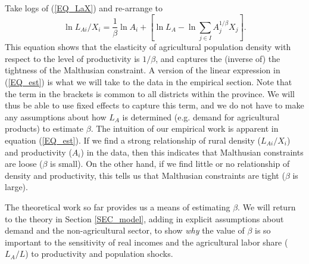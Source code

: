 \documentclass[11pt]{article}
\begin{document}
Take logs of (\ref{EQ_LaX}) and re-arrange to
\begin{equation}
\ln L_{Ai}/X_i = \frac{1}{\beta} \ln A_{i} + \left[\ln L_A - \ln \sum_{j\in I} A_{j}^{1/\beta}X_{j} \right]. \label{EQ_est}
\end{equation}
This equation shows that the elasticity of agricultural population density with respect to the level of productivity is $1/\beta$, and captures the (inverse of) the tightness of the Malthusian constraint. A version of the linear expression in (\ref{EQ_est}) is what we will take to the data in the empirical section. Note that the term in the brackets is common to all districts within the province. We will thus be able to use fixed effects to capture this term, and we do not have to make any assumptions about how $L_A$ is determined (e.g. demand for agricultural products) to estimate $\beta$. The intuition of our empirical work is apparent in equation (\ref{EQ_est}). If we find a strong relationship of rural density ($L_{Ai}/X_i$) and productivity ($A_i$) in the data, then this indicates that Malthusian constraints are loose ($\beta$ is small). On the other hand, if we find little or no relationship of density and productivity, this tells us that Malthusian constraints are tight ($\beta$ is large). 

The theoretical work so far provides us a means of estimating $\beta$. We will return to the theory in Section \ref{SEC_model}, adding in explicit assumptions about demand and the non-agricultural sector, to show \textit{why} the value of $\beta$ is so important to the sensitivity of real incomes and the agricultural labor share ($L_A/L$) to productivity and population shocks.
\end{document}
